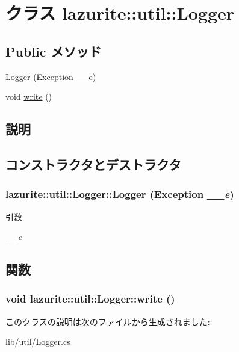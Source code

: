 \hypertarget{classlazurite_1_1util_1_1_logger}{
\section{クラス lazurite::util::Logger}
\label{classlazurite_1_1util_1_1_logger}
}
\subsection*{Public メソッド}
\begin{DoxyCompactItemize}
\item 
\hyperlink{classlazurite_1_1util_1_1_logger_a05eb51dd59ef0b7ce213581194cd96db}{Logger} (Exception \_\-\_\-e)
\item 
void \hyperlink{classlazurite_1_1util_1_1_logger_af00f6c3529673a39852baf91f88a5ea6}{write} ()
\end{DoxyCompactItemize}


\subsection{説明}


\subsection{コンストラクタとデストラクタ}
\hypertarget{classlazurite_1_1util_1_1_logger_a05eb51dd59ef0b7ce213581194cd96db}{
\subsubsection[{Logger}]{\setlength{\rightskip}{0pt plus 5cm}lazurite::util::Logger::Logger (Exception {\em \_\-\_\-e})}}
\label{classlazurite_1_1util_1_1_logger_a05eb51dd59ef0b7ce213581194cd96db}

\begin{DoxyParams}{引数}
\item[{\em \_\-\_\-e}]\end{DoxyParams}


\subsection{関数}
\hypertarget{classlazurite_1_1util_1_1_logger_af00f6c3529673a39852baf91f88a5ea6}{
\subsubsection[{write}]{\setlength{\rightskip}{0pt plus 5cm}void lazurite::util::Logger::write ()}}
\label{classlazurite_1_1util_1_1_logger_af00f6c3529673a39852baf91f88a5ea6}


このクラスの説明は次のファイルから生成されました:\begin{DoxyCompactItemize}
\item 
lib/util/Logger.cs\end{DoxyCompactItemize}
